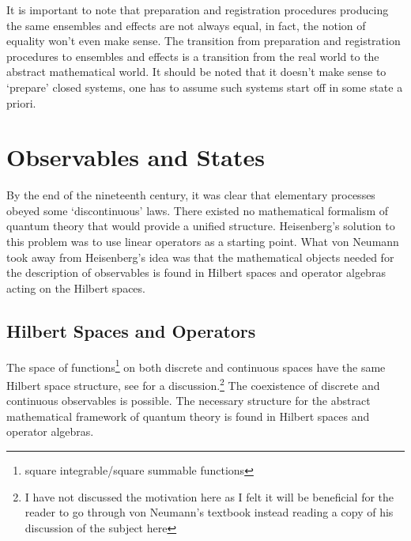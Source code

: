 \documentclass[11pt]{report}
\begin{document}
			It is important to note that preparation and registration procedures producing the same ensembles and effects are not always equal, in fact, the notion of equality won't even make sense. The transition from preparation and registration procedures to ensembles and effects is a transition from the real world to the abstract mathematical world. It should be noted that it doesn't make sense to `prepare' closed systems, one has to assume such systems start off in some state a priori. 
			
			\section{Observables and States}
			By the end of the nineteenth century, it was clear that elementary processes obeyed some `discontinuous' laws. There existed no mathematical formalism of quantum theory that would provide a unified structure. Heisenberg's solution to this problem was to use linear operators as a starting point. What von Neumann took away from Heisenberg's idea was that the mathematical objects needed for the description of observables is found in Hilbert spaces and operator algebras acting on the Hilbert spaces.
			\subsection{{Hilbert Spaces and Operators}}
			The space of functions\footnote{square integrable/square summable functions} on both discrete and continuous spaces have the same Hilbert space structure, see  \cite{vonNeumann} for a discussion.\footnote{I have not discussed the motivation here as I felt it will be beneficial for the reader to go through von Neumann's textbook instead reading a copy of his discussion of the subject here} The coexistence of discrete and continuous observables is possible. The necessary structure for the abstract mathematical framework of quantum theory is found in Hilbert spaces and operator algebras.
			
\end{document}
